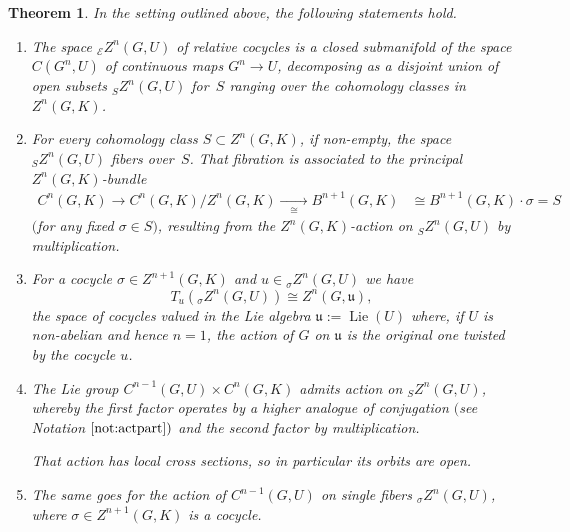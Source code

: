 \documentclass[pdftex]{sigma}
\numberwithin{equation}{section}
\newtheorem*{Theorem*}{Theorem}
\newcommand\cE{{\mathcal E}}
\newcommand\fu{{\mathfrak u}}
\begin{document}
\begin{Theorem*}
 In the setting outlined above, the following statements hold.
 \begin{enumerate}[$(a)$]\itemsep=0pt



 \item The space ${}_{\cE}Z^n(G,U)$ of relative cocycles is a closed submanifold of the space $C(G^n,U)$ of continuous maps $G^n\to U$, decomposing as a disjoint union of open subsets ${}_S Z^n(G,U)$ for~$S$ ranging over the cohomology classes in $Z^n(G,K)$.


 \item\label{item:12} For every cohomology class $S\subset Z^n(G,K)$, if non-empty, the space ${}_S Z^{n}(G,U)$ fibers over~$S$. That fibration is associated to the principal $Z^n(G,K)$-bundle
 \begin{align*}
 C^n(G,K) \xrightarrow{\quad}
 C^n(G,K)/Z^n(G,K) \xrightarrow[\quad\cong\quad]{}
 B^{n+1}(G,K) &\cong B^{n+1}(G,K)\cdot \sigma=S
 \end{align*}
 $($for any fixed $\sigma\in S)$, resulting from the $Z^n(G,K)$-action on ${}_SZ^n(G,U)$ by multiplication.


 \item For a cocycle $\sigma\in Z^{n+1}(G,K)$ and $u\in {}_{\sigma}Z^n(G,U)$ we have
 \begin{equation*}
 T_u \left({}_{\sigma}Z^n(G,U)\right)
 \cong
 Z^n(G,\fu),
 \end{equation*}
 the space of cocycles valued in the Lie algebra $\fu:=\operatorname{Lie}(U)$ where, if $U$ is non-abelian and hence $n=1$, the action of $G$ on $\fu$ is the original one twisted by the cocycle $u$.

 \item The Lie group $C^{n-1}(G,U)\times C^n(G,K)$ admits action on ${}_S Z^n(G,U)$, whereby the first factor operates by a higher analogue of conjugation $($see Notation $\ref{not:actpart})$ and the second factor by multiplication.

 That action has local cross sections, so in particular its orbits are open.

 \item\label{item:13} The same goes for the action of $C^{n-1}(G,U)$ on single fibers ${}_{\sigma}Z^n(G,U)$, where $\sigma\!\!\in\!\! Z^{n+1}(G,K)$ is a cocycle.
 \end{enumerate}
\end{Theorem*}
\end{document}
